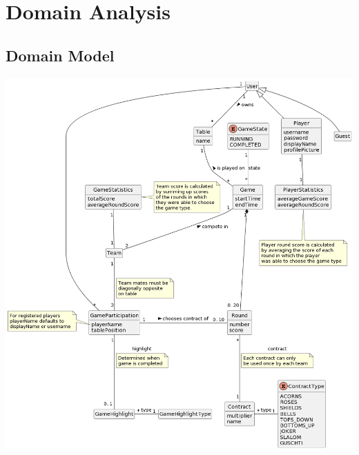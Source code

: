 \chapter{Domain Analysis}

\section{Domain Model}

\includegraphics[width=\textwidth]{resources/diagrams/domain-model}

